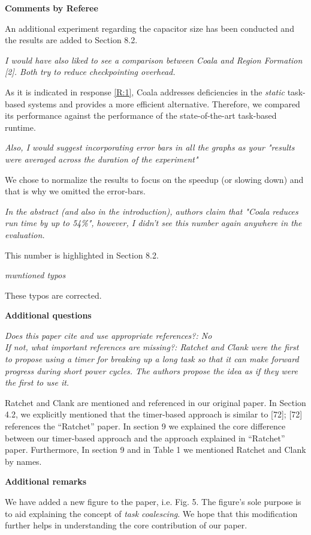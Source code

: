 \documentclass[10pt]{article}
\newcommand{\referee}[1]{
	{\item \color{OliveGreen} \emph{{#1}}}
	\label{R\therefereeCounter:\arabic{enumi}}
}
\newcommand{\response}[1]{{\color{blue} #1}}
\newenvironment{additionalQuestions}{%
\textbf{\large Additional questions}
\begin{enumerate}%
\renewcommand{\labelenumi}{\textbf{[Q:\,\arabic{enumi}]}} %
}{\end{enumerate}}
\newenvironment{editor}{%
\textbf{\large Additional remarks}
\begin{enumerate}%
\renewcommand{\labelenumi}{\textbf{[R:\,\arabic{enumi}]}} %
}{\end{enumerate}}
\newcounter{refereeCounter}
\newenvironment{responses}{%
\refstepcounter{refereeCounter}%
\textbf{\large Comments by Referee \therefereeCounter}
\begin{enumerate}%
\renewcommand{\labelenumi}{\textbf{[C:\,\arabic{enumi}]}} %
}{\end{enumerate}}
\begin{document}
\begin{responses}
\response{An additional experiment regarding the capacitor size has been conducted and the results are added to Section 8.2.}

\referee{I would have also liked to see a comparison between Coala and Region Formation [2]. Both try to reduce checkpointing overhead.}

\response{As it is indicated in response \hyperref[R:1]{[R:1]}, Coala addresses deficiencies in the \emph{static} task-based systems and provides a more efficient alternative. Therefore, we compared its performance against the performance of the state-of-the-art task-based runtime.}

\referee{Also, I would suggest incorporating error bars in all the graphs as your "results were averaged across the duration of the experiment"}

\response{We chose to normalize the results to focus on the speedup (or slowing down) and that is why we omitted the error-bars.}

\referee{In the abstract (and also in the introduction), authors claim that "Coala reduces run time by up to 54\%", however, I didn't see this number again anywhere in the evaluation.}

\response{This number is highlighted in Section 8.2.}



\referee{mwntioned typos}

\response{These typos are corrected.}


\end{responses}


\begin{additionalQuestions}
\referee{Does this paper cite and use appropriate references?: No\\
If not, what important references are missing?: 
Ratchet and Clank were the first to propose using a timer for breaking up a long task so that it can make forward progress during short power cycles.  The authors propose the idea as if they were the first to use it.}

\response{Ratchet and Clank are mentioned and referenced in our original paper. 
In Section 4.2, we explicitly mentioned that the timer-based approach is similar to [72]; [72] references the ``Ratchet'' paper. 
In section 9 we explained the core difference between our timer-based approach and the approach explained  in ``Ratchet'' paper. Furthermore, In section 9 and in Table 1 we mentioned Ratchet and Clank by names.}
\end{additionalQuestions}

\begin{editor}
\referee{}
\response{We have added a new figure to the paper, i.e. Fig. 5. The figure's sole purpose is to aid explaining the concept of \textit{task coalescing}.
We hope that this modification further helps in understanding the core contribution of our paper.}
\end{editor}
\end{document}
